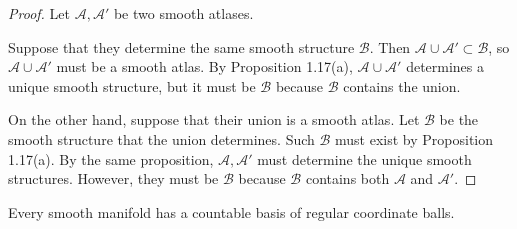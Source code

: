 \begin{proof}
  Let $\mathcal{A}, \mathcal{A}'$ be two smooth atlases.

  Suppose that they determine the same smooth structure $\mathcal{B}$.
  Then $\mathcal{A} \cup \mathcal{A}' \subset \mathcal{B}$, so $\mathcal{A} \cup \mathcal{A}'$ must be a smooth atlas.
  By Proposition 1.17(a), $\mathcal{A} \cup \mathcal{A}'$ determines a unique smooth structure, but it must be $\mathcal{B}$ because $\mathcal{B}$ contains the union.

  On the other hand, suppose that their union is a smooth atlas.
  Let $\mathcal{B}$ be the smooth structure that the union determines.
  Such $\mathcal{B}$ must exist by Proposition 1.17(a).
  By the same proposition, $\mathcal{A}, \mathcal{A}'$ must determine the unique smooth structures.
  However, they must be $\mathcal{B}$ because $\mathcal{B}$ contains both $\mathcal{A}$ and $\mathcal{A}'$.
\end{proof}

\begin{customexer}{1.20}
  Every smooth manifold has a countable basis of regular coordinate balls.
\end{customexer}


